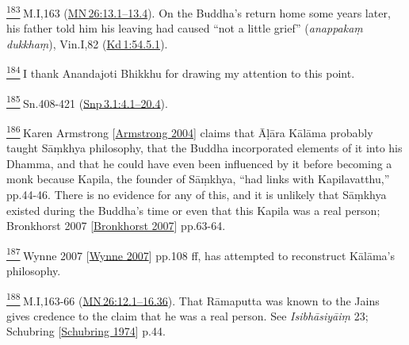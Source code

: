 \label{footprints_split_024.html_fn183}
\hyperref[footprints_split_009.htmlux5cux23fnref183]{\textsuperscript{183}} M.I,163
(\href{https://suttacentral.net/mn26/en/sujato\#13.1}{MN\,26:13.1--13.4}).
On the Buddha's return home some years later, his father told him his
leaving had caused ``not a little grief'' (\emph{anappakaṃ dukkhaṃ}),
Vin.I,82
(\href{https://suttacentral.net/pli-tv-kd1/en/brahmali\#54.5.1}{Kd\,1:54.5.1}).

\label{footprints_split_024.html_fn184}
\hyperref[footprints_split_009.htmlux5cux23fnref184]{\textsuperscript{184}} I
thank Anandajoti Bhikkhu for drawing my attention to this point.

\label{footprints_split_024.html_fn185}
\hyperref[footprints_split_009.htmlux5cux23fnref185]{\textsuperscript{185}} Sn.408-421
(\href{https://suttacentral.net/snp3.1/en/sujato\#4.1}{Snp\,3.1:4.1--20.4}).

\label{footprints_split_024.html_fn186}
\hyperref[footprints_split_009.htmlux5cux23fnref186]{\textsuperscript{186}} {Karen
Armstrong
{{[}\hyperref[footprints_split_022.htmlux5cux23Armstrongux5cux25202004]{Armstrong
2004}{]}}} claims that Āḷāra Kālāma probably taught Sāṃkhya philosophy,
that the Buddha incorporated elements of it into his Dhamma, and that he
could have even been influenced by it before becoming a monk because
Kapila, the founder of Sāṃkhya, ``had links with Kapilavatthu,''
pp.44-46. There is no evidence for any of this, and it is unlikely that
Sāṃkhya existed during the Buddha's time or even that this Kapila was a
real person; {Bronkhorst 2007
{{[}\hyperref[footprints_split_022.htmlux5cux23Bronkhorstux5cux25202007]{Bronkhorst
2007}{]}}} pp.63-64.

\label{footprints_split_024.html_fn187}
\hyperref[footprints_split_009.htmlux5cux23fnref187]{\textsuperscript{187}} {Wynne
2007
{{[}\hyperref[footprints_split_022.htmlux5cux23Wynneux5cux25202007]{Wynne
2007}{]}}} pp.108 ff, has attempted to reconstruct Kālāma's philosophy.

\label{footprints_split_024.html_fn188}
\hyperref[footprints_split_009.htmlux5cux23fnref188]{\textsuperscript{188}} M.I,163-66
(\href{https://suttacentral.net/mn26/en/sujato\#12.1}{MN\,26:12.1--16.36}).
That Rāmaputta was known to the Jains gives credence to the claim that
he was a real person. See \emph{Isibhāsiyāiṃ} 23; {Schubring
{{[}\hyperref[footprints_split_022.htmlux5cux23Schubringux5cux25201974]{Schubring
1974}{]}}} p.44.

